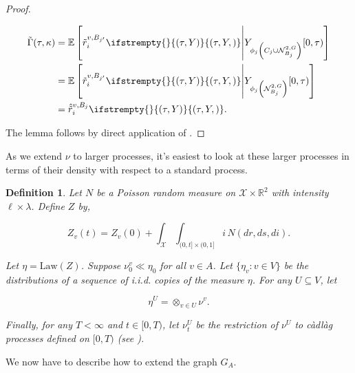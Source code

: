 \documentclass[12pt]{article}
\newcommand{\mb}{\mathbb}
\newcommand{\mc}{\mathcal}
\newcommand{\te}{\text}
\newcommand{\ind}{\hspace{24pt}}
\newcommand{\ex}[1]{\mb{E}\left[#1\right]}			%
\newcommand{\sta}{\mc{X}}							%
\newcommand{\dgneigh}[2]{\mc{N}^{2,#1}_{#2}}		%
\newcommand{\poiss}{N}								%
\newcommand{\leb}{\lambda}							%
\newcommand{\Sm}{\ell}								%
\newcommand{\rate}{r}								%
\newcommand{\vind}[1]{_{#1}}						%
\newcommand{\tme}[1]{(#1)}							%
\newcommand{\tmi}[1]{#1}							%
\newcommand{\vpara}[1]{^{#1}}						%
\newcommand{\stpara}[1]{_{#1}}						%
\newcommand{\tpara}[1]{_{#1}}						%
\newcommand{\tmepro}[3]{
\ifstrempty{#3}{
	\left(#1,#2\right)}{
	\left(#1,#2,#3\right)}}							%
\newcommand{\Xg}{Y}									%
\newcommand{\brate}{\alt{\rate}}					%
\newcommand{\alt}[1]{\tilde{#1}}					%
\newcommand{\rt}{\tau}								%
\renewcommand{\mark}{\kappa}						%
\newcommand{\ratee}{\Gamma}							%
\newcommand{\cratee}{\alt{\ratee}}					%
\newcommand{\mm}{\nu}								%
\newcommand{\law}{\te{Law}}							%
\newcommand{\Xh}{Z}									%
\newcommand{\bcrate}{\hat{\brate}}					%
\newcommand{\mmm}{\eta}								%
\newcommand{\vjpara}[2]{^{#1,#2}}					%
\newtheorem{defn}[thms]{Definition}
\begin{document}
\begin{proof}
\begin{description}
\begin{align*}
\cratee(\rt,\mark) &= \ex{\brate\vjpara{v}{B_{j'}}\stpara{i}\tmepro{\rt}{\Xg}{}\middle|\Xg\vind{\phi_j\left(C_j\cup\dgneigh{G}{B_j}\right)}\tmi{[0,\rt)}}\\
&= \ex{\brate\vjpara{v}{B_{j'}}\stpara{i}\tmepro{\rt}{\Xg}{}\middle|\Xg\vind{\phi_j\left(\dgneigh{G}{B_j}\right)}\tmi{[0,\rt)}}\\
&= \bcrate\vjpara{v}{B_j}\stpara{i}\tmepro{\rt}{\Xg}{}.
\end{align*}
\end{description}

The lemma follows by direct application of \cite[Exercise 14.7.1]{DalVer08}.
\end{proof}

As we extend \(\mm\) to larger processes, it's easiest to look at these larger processes in terms of their density with respect to a standard process.

\begin{defn}
Let \(\poiss\) be a Poisson random measure on \(\sta\times\mb{R}^2\) with intensity \(\Sm\times\leb\). Define \(\Xh\) by,

\[\Xh\vind{v}\tme{t} = \Xh\vind{v}\tme{0} + \int_{\sta}\int_{(0,t]\times (0,1]}i\,\poiss(dr,ds,di).\]

\ind Let \(\mmm = \law(\Xh)\). Suppose \(\mm\vpara{v}\tpara{0}\ll\mmm\tpara{0}\) for all \(v\in A\). Let \(\{\mmm\vind{v}:v\in V\}\) be the distributions of a sequence of i.i.d. copies of the measure \(\mmm\). For any \(U\subseteq V\), let 

\[\mmm\vpara{U} = \otimes_{v\in U} \mm\vpara{v}.\]

Finally, for any \(T < \infty\) and \(t\in [0,T)\), let \(\mm\vpara{U}\tpara{t}\) be the restriction of \(\mm\vpara{U}\) to c\`adl\`ag processes defined on \([0,T)\) (see \cite[section \ref{F-not::p}]{F}).
\label{Uq::eta}
\end{defn}

We now have to describe how to extend the graph \(G\vind{A}\).
\end{document}
